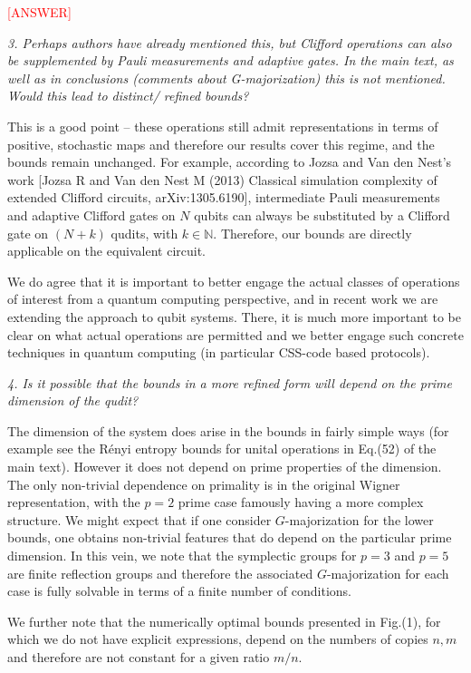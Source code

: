 \documentclass[11pt]{letter}
\newcommand{\nick}[1]{\textcolor{red}{[#1]}}
\begin{document}
\nick{ANSWER}

\textit{3. Perhaps authors have already mentioned this, but Clifford operations can also be supplemented by Pauli measurements and adaptive gates. In the main text, as well as in conclusions (comments about G-majorization) this is not mentioned. Would this lead to distinct/ refined bounds?}

This is a good point -- these operations still admit representations in terms of positive, stochastic maps and therefore our results cover this regime, and the bounds remain unchanged. 
For example, according to Jozsa and Van den Nest's work [Jozsa R and Van den Nest M (2013) Classical simulation complexity of extended Clifford circuits, arXiv:1305.6190], intermediate Pauli measurements and adaptive Clifford gates on $N$ qubits can always be substituted by a Clifford gate on $(N+k)$ qudits, with $k \in \mathbb{N}$.
Therefore, our bounds are directly applicable on the equivalent circuit.

We do agree that it is important to better engage the actual classes of operations of interest from a quantum computing perspective, and in recent work we are extending the approach to qubit systems. There, it is much more important to be clear on what actual operations are permitted and we better engage such concrete techniques in quantum computing (in particular CSS-code based protocols).

\textit{4. Is it possible that the bounds in a more refined form will depend on the prime dimension of the qudit?}

The dimension of the system does arise in the bounds in fairly simple ways (for example see the R\'{e}nyi entropy bounds for unital operations in Eq.(52) of the main text).  However it does not depend on prime properties of the dimension.  The only non-trivial dependence on primality is in the original Wigner representation,  with the $p=2$ prime case famously having a more complex structure.  We might expect that if one consider $G$-majorization for the lower bounds,  one obtains non-trivial features that do depend on the particular prime dimension.  In this vein,  we note that the symplectic groups for $p=3$ and $p=5$ are finite reflection groups and therefore the associated $G$-majorization for each case is fully solvable in terms of a finite number of conditions.

We further note that the numerically optimal bounds presented in Fig.(1), for which we do not have explicit expressions, depend on the numbers of copies $n,m$ and therefore are not constant for a given ratio $m/n$.
\end{document}
